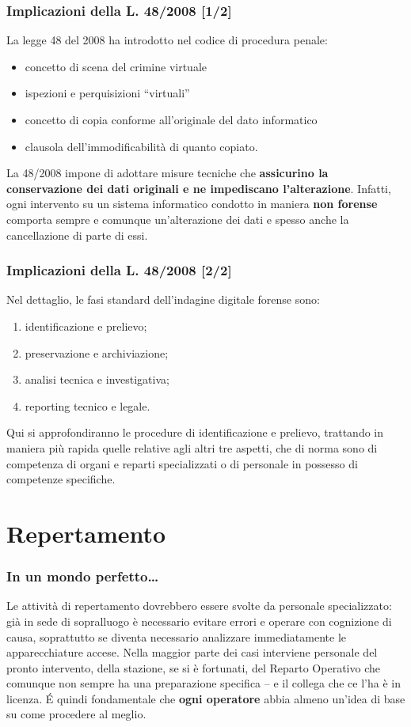 \documentclass[11pt]{beamer}
\begin{document}
	\begin{frame}
		\frametitle{Implicazioni della L. 48/2008 [1/2]}
		La legge 48 del 2008 ha introdotto nel codice di procedura penale:
		\begin{itemize}
		\item concetto di scena del crimine virtuale
		\item ispezioni e perquisizioni ``virtuali''
		\item concetto di copia conforme all'originale del dato informatico
		\item clausola dell'immodificabilità di quanto copiato.
		\end{itemize}		
		\vfill
		La 48/2008 impone di adottare misure tecniche che \textbf{assicurino la conservazione dei dati originali e ne impediscano l'alterazione}.
		\vfill
		Infatti, ogni intervento su un sistema informatico  condotto in maniera \textbf{non forense} comporta sempre e comunque un'alterazione dei dati e spesso anche la cancellazione di parte di essi.
	\end{frame}
	\begin{frame}
		\frametitle{Implicazioni della L. 48/2008 [2/2]}	
		Nel dettaglio, le fasi standard dell'indagine digitale forense sono:
		\begin{enumerate}
			\item identificazione e prelievo;
			\item preservazione e archiviazione;
			\item analisi tecnica e investigativa;
			\item reporting tecnico e legale.
		\end{enumerate}
		\vfill
		Qui si approfondiranno le procedure di identificazione e prelievo, trattando in maniera più rapida quelle relative agli altri tre aspetti, che di norma sono di competenza di organi e reparti specializzati o di personale in possesso di competenze specifiche.
	\end{frame}
	
	\section{Repertamento}
	
	\begin{frame}
		\frametitle{In un mondo perfetto\dots}
		Le attività di repertamento dovrebbero essere svolte da personale specializzato: già in sede di sopralluogo è necessario evitare errori e operare con cognizione di causa, soprattutto se diventa necessario analizzare immediatamente le apparecchiature accese.
		\vfill
		Nella maggior parte dei casi interviene personale del pronto intervento, della stazione, se si è fortunati, del Reparto Operativo che comunque non sempre ha una preparazione specifica -- e il collega che ce l'ha è in licenza. 
		\vfill
		\'{E} quindi fondamentale che \textbf{ogni operatore} abbia almeno un'idea di base su come procedere al meglio.
	\end{frame}
	
\end{document}
